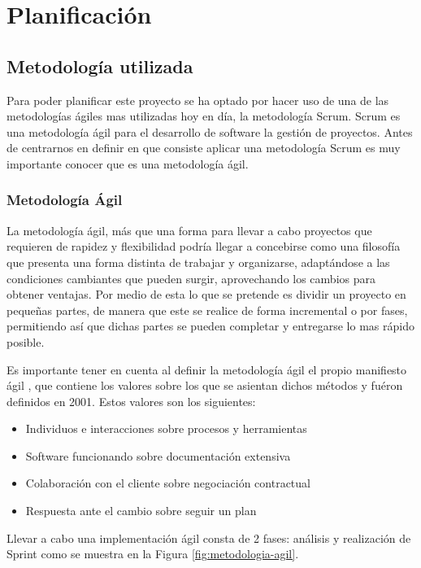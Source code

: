 \chapter{Planificación} \label{ch:planificación}

\section{Metodología utilizada}

Para poder planificar este proyecto se ha optado por hacer uso de una de las metodologías ágiles mas utilizadas hoy en día, la metodología Scrum. Scrum es una metodología ágil para el desarrollo de software la gestión de proyectos. Antes de centrarnos en definir en que consiste aplicar una metodología Scrum es muy importante conocer que es una metodología ágil.

\subsection{Metodología Ágil}

La metodología ágil, más que una forma para llevar a cabo proyectos que requieren de rapidez y flexibilidad podría llegar a concebirse como una filosofía que presenta una forma distinta de trabajar y organizarse, adaptándose a las condiciones cambiantes que pueden surgir, aprovechando los cambios para obtener ventajas. Por medio de esta lo que se pretende es dividir un proyecto en pequeñas partes, de manera que este se realice de forma incremental o por fases, permitiendo así que dichas partes se pueden completar y entregarse lo mas rápido posible. 

Es importante tener en cuenta al definir la metodología ágil el propio manifiesto ágil \cite{manifiesto-agil}, que contiene los valores sobre los que se asientan dichos métodos y fuéron definidos en 2001. Estos valores son los siguientes:

\begin{itemize}
	\item Individuos e interacciones sobre procesos y herramientas
	\item Software funcionando sobre documentación extensiva
	\item Colaboración con el cliente sobre negociación contractual
	\item Respuesta ante el cambio sobre seguir un plan
\end{itemize}

Llevar a cabo una implementación ágil consta de 2 fases: análisis y realización de Sprint como se muestra en la Figura \ref{fig:metodologia-agil}.

